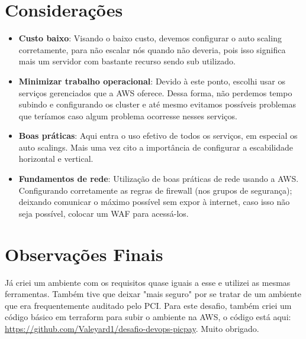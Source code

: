 \documentclass{article}
\begin{document}
    \section{Considerações}
        \begin{itemize}
            \item \textbf{Custo baixo}: Visando o baixo custo, devemos configurar o auto scaling corretamente, para não escalar nós quando não deveria, pois isso significa mais um servidor com bastante recurso sendo sub utilizado.
            \item \textbf{Minimizar trabalho operacional}: Devido à este ponto, escolhi usar os serviços gerenciados que a AWS oferece. Dessa forma, não perdemos tempo subindo e configurando os cluster e até mesmo evitamos possíveis problemas que teríamos caso algum problema ocorresse nesses serviços.
            \item \textbf{Boas práticas}: Aqui entra o uso efetivo de todos os serviços, em especial os auto scalings. Mais uma vez cito a importância de configurar a escabilidade horizontal e vertical.
            \item \textbf{Fundamentos de rede}: Utilização de boas práticas de rede usando a AWS. Configurando corretamente as regras de firewall (nos grupos de segurança); deixando comunicar o máximo possível sem expor à internet, caso isso não seja possível, colocar um WAF para acessá-los.
        \end{itemize}

    \section{Observações Finais}
        Já criei um ambiente com os requisitos quase iguais a esse e utilizei as mesmas ferramentas. Também tive que deixar "mais seguro" por se tratar de um ambiente que era frequentemente auditado pelo PCI.
        Para este desafio, também criei um código básico em terraform para subir o ambiente na AWS, o código está aqui: \href{https://github.com/Valeyard1/desafio-devops-picpay}{https://github.com/Valeyard1/desafio-devops-picpay}.
        \newline
        \newline
        Muito obrigado.
\end{document}
